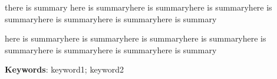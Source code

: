 \documentclass[a4paper,12pt]{article}
\begin{document}
	there is summary here is summaryhere is summaryhere is summaryhere is summaryhere is summaryhere is summaryhere is summary
	
	here is summaryhere is summaryhere is summaryhere is summaryhere is summaryhere is summaryhere is summaryhere is summary                                                  %

	\noindent\textbf{\small{Keywords}}:  keyword1; keyword2             %
	\clearpage
	\tableofcontents
	\clearpage
	\pagestyle{fancy}
	\setcounter{page}{1}
	
	
		
	






\end{document}
